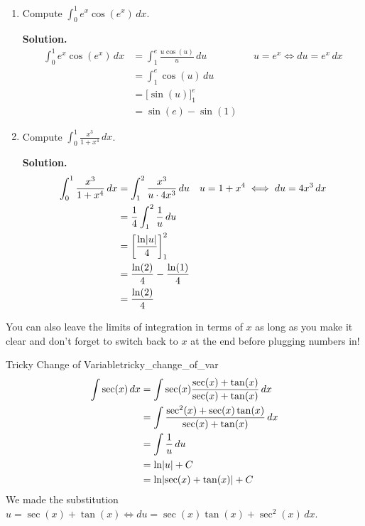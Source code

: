 \begin{Example}{}{}
    \begin{enumerate}[label=(\roman*)]
        \item Compute $ \displaystyle  \int_{0}^{1} e^x\cos(e^x)\, d{x} $.

              \textbf{Solution.}
              \begin{align*}
                  \int_{0}^{1} e^x\cos(e^x)\, d{x}
                   & =\int_{1}^{e}\frac{u\cos(u)}{u} \, d{u} &  & u=e^x\iff du=e^x\,dx \\
                   & =\int_{1}^{e} \cos(u)\, d{u}                                      \\
                   & =\bigl[\sin(u)\bigr]_{1}^e                                        \\
                   & =\sin(e)-\sin(1)
              \end{align*}
        \item Compute $ \displaystyle \int_{0}^{1} \frac{x^3}{1+x^4} \, d{x} $.

              \textbf{Solution.}
              \begin{align*}
                  \int_{0}^{1} \frac{x^3}{1+x^4} \, d{x}
                   & =\int_{1}^{2} \frac{x^3}{u\cdot4x^3}\, d{u}   &  & u=1+x^4\iff du=4x^3\,dx \\
                   & =\frac{1}{4} \int_{1}^{2} \frac{1}{u} \, d{u}                              \\
                   & =\left[ \frac{\ln\lvert u\rvert}{4}  \right]_{1}^2                                \\
                   & =\frac{\ln(2)}{4} -\frac{\ln(1)}{4}                                        \\
                   & =\frac{\ln(2)}{4}
              \end{align*}
    \end{enumerate}
\end{Example}

\begin{Remark}{}{}
    You can also leave the limits of integration in terms of $ x $ as long as
    you make it clear and don't forget to switch back to $ x $ at the end before
    plugging numbers in!
\end{Remark}

\begin{Example}{Tricky Change of Variable}{tricky_change_of_var}
    \begin{align*}
        \int \sec(x)\, d{x}
         & =\int \sec(x)\frac{\sec(x)+\tan(x)}{\sec(x)+\tan(x)}\, d{x}    \\
         & =\int \frac{\sec^2(x)+\sec(x)\tan(x)}{\sec(x)+\tan(x)} \, d{x} \\
         & =\int \frac{1}{u}\, d{u}                                       \\
         & =\ln\lvert u\rvert+C                                                  \\
         & =\ln\lvert\sec(x)+\tan(x)\rvert+C
    \end{align*}
    We made the substitution $ u=\sec(x)+\tan(x)\iff du=\sec(x)\tan(x)+\sec^2(x)\,dx $.
\end{Example}


